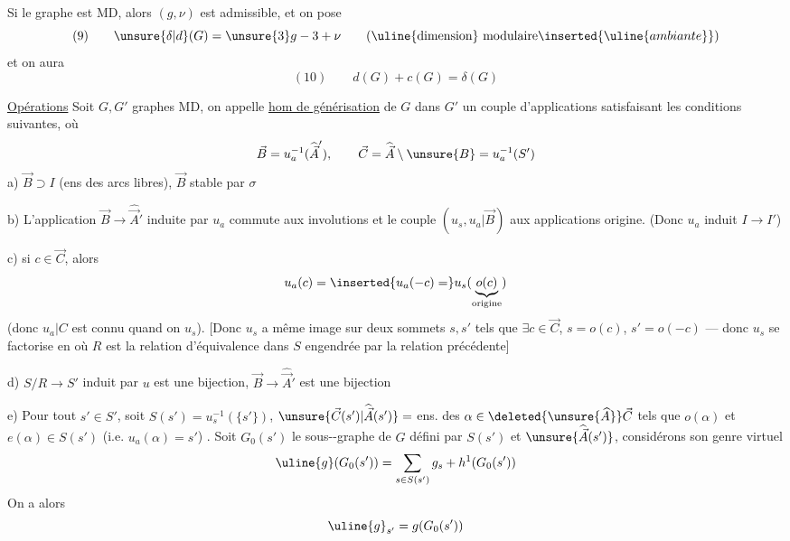 
 Si le graphe est MD, alors $(g,\nu)$ est admissible, et on pose
\[
(9)\qquad \unsure{\delta|d}(G)=\unsure{3}g-3+\nu
\qquad (\uline{\text{dimension}}\ \text{modulaire}\inserted{\uline{ambiante}})
\]
et on aura
\[
(10)\qquad d(G)+c(G)=\delta(G)
\]

\uline{Opérations} 
Soit $G,G'$  graphes MD, on appelle \uline{hom de générisation}  de $G$ dans $G'$ un couple d'applications
satisfaisant les conditions suivantes, où
\[
\vec B=u_a^{-1}(\widehat{\vec A}'),\qquad
\vec C=\widehat{\vec A}\setminus\unsure{B}=u_a^{-1}(S')
\]
a) $\vec B\supset I$ (ens des arcs libres), $\vec B$ stable par $\sigma$

b) L'application $\vec B\longrightarrow\widehat{\vec A}'$ induite par $u_a$ commute aux involutions et le couple $(u_s,u_a|\vec B)$  aux applications origine.
(Donc $u_a$ induit $I\longrightarrow I'$)


c)  si $c\in\vec C$, alors
\[
u_a(c)=\inserted{u_a(-c)=}u_s(\underbrace{o(c)}_{\text{origine}})
\]
(donc $u_a|C$ est connu quand on  $u_s$). 
[Donc  $u_s$ a même image sur deux  sommets $s,s'$ tels que $\exists c\in\vec C$, $s=o(c)$, $s'=o(-c)$ --- donc $u_s$ se factorise en
où $R$ est la relation d'équivalence dans $S$ engendrée par la relation précédente]

d) $S/R\longrightarrow S'$ induit par $u$ est une bijection,
$\vec B\longrightarrow\widehat{\vec A}'$ est une bijection


e) Pour tout $s'\in S'$, soit $S(s')=u_s^{-1}(\{s'\})$, $\unsure{\vec C(s')|\widehat{\vec A}(s')}=$ ens. des $\alpha\in\deleted{\unsure{\widehat A}}\vec C$ tels que
$o(\alpha)$ et $e(\alpha)\in S(s')$
(i.e. $u_a(\alpha)=s'$)
.
Soit  $G_0(s')$ le sous--graphe  de $G$ défini par $S(s')$ et $\unsure{\widehat{\vec A}(s')}$, considérons son genre virtuel
\[
\uline{g}(G_0(s'))=\sum_{s\in S(s')}g_s+h^1(G_0(s'))
\]
On a alors
\[
\uline{g}_{s'}=g(G_0(s'))
\]
